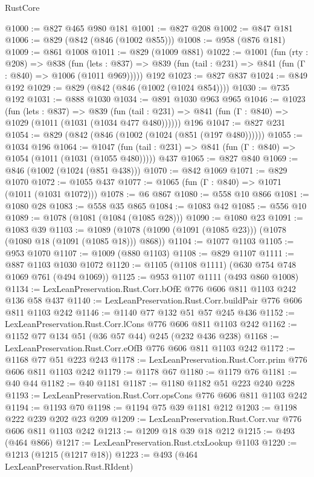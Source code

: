 \begin{lexlean}{RustCore}
\begin{coremodule}
@1000 := @827 @465 @980 @181
@1001 := @827 @208
@1002 := @847 @181
@1006 := @829 (@842 (@846 (@1002 @855)))
@1008 := @958 (@876 @181)
@1009 := @861 @1008
@1011 := @829 (@1009 @881)
@1022 := @1001
    (fun (rty : @208) =>
    @838
      (fun (lets : @837) =>
      @839 (fun (tail : @231) => @841 (fun (Γ : @840) => @1006 (@1011 @969)))))
    @192
@1023 := @827 @837
@1024 := @849 @192
@1029 := @829 (@842 (@846 (@1002 (@1024 @854))))
@1030 := @735 @192
@1031 := @888 @1030
@1034 := @891 @1030 @963 @965
@1046 := @1023
    (fun (lets : @837) =>
    @839 (fun (tail : @231) => @841 (fun (Γ : @840) => @1029 (@1011 (@1031 (@1034 @477 @480))))))
    @196
@1047 := @827 @231
@1054 := @829 (@842 (@846 (@1002 (@1024 (@851 (@197 @480))))))
@1055 := @1034 @196
@1064 := @1047
    (fun (tail : @231) => @841 (fun (Γ : @840) => @1054 (@1011 (@1031 (@1055 @480)))))
    @437
@1065 := @827 @840
@1069 := @846 (@1002 (@1024 (@851 @438)))
@1070 := @842 @1069
@1071 := @829 @1070
@1072 := @1055 @437
@1077 := @1065 (fun (Γ : @840) => @1071 (@1011 (@1031 @1072)))
@1078 := @6 @867
@1080 := @558 @10 @866
@1081 := @1080 @28
@1083 := @558 @35 @865
@1084 := @1083 @42
@1085 := @556 @10
@1089 := @1078 (@1081 (@1084 (@1085 @28)))
@1090 := @1080 @23
@1091 := @1083 @39
@1103 := @1089 (@1078 (@1090 (@1091 (@1085 @23))) (@1078 (@1080 @18 (@1091 (@1085 @18))) @868))
@1104 := @1077 @1103
@1105 := @953 @1070
@1107 := @1009 (@880 @1103)
@1108 := @829 @1107
@1111 := @887 @1103 @1030 @1072
@1120 := @1105 (@1108 @1111) (@630 @754 @748 @1069 @761 (@494 @1069))
@1125 := @953 @1107 @1111 (@493 @860 @1008)
@1134 := LexLeanPreservation.Rust.Corr.bOfE @776 @606 @811 @1103 @242 @136 @58 @437
@1140 := LexLeanPreservation.Rust.Corr.buildPair @776 @606 @811 @1103 @242
@1146 := @1140 @77 @132 @51 @57 @245 @436
@1152 := LexLeanPreservation.Rust.Corr.lCons @776 @606 @811 @1103 @242
@1162 := @1152 @77 @134 @51 (@36 @57 @44) @245 (@232 @436 @238)
@1168 := LexLeanPreservation.Rust.Corr.eOfB @776 @606 @811 @1103 @242
@1172 := @1168 @77 @51 @223 @243
@1178 := LexLeanPreservation.Rust.Corr.prim @776 @606 @811 @1103 @242
@1179 := @1178 @67
@1180 := @1179 @76
@1181 := @40 @44
@1182 := @40 @1181
@1187 := @1180 @1182 @51 @223 @240 @228
@1193 := LexLeanPreservation.Rust.Corr.opsCons @776 @606 @811 @1103 @242
@1194 := @1193 @70
@1198 := @1194 @75 @39 @1181 @212
@1203 := @1198 @222 @239 @202 @23 @209
@1209 := LexLeanPreservation.Rust.Corr.var @776 @606 @811 @1103 @242
@1213 := @1209 @18 @39 @18 @212
@1215 := @493 (@464 @866)
@1217 := LexLeanPreservation.Rust.ctxLookup @1103
@1220 := @1213 (@1215 (@1217 @18))
@1223 := @493 (@464 LexLeanPreservation.Rust.RIdent)

\end{coremodule}
\end{lexlean}
